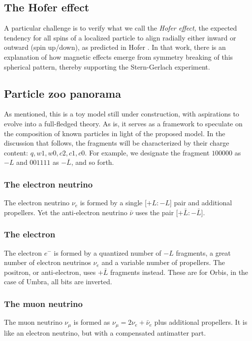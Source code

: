 \documentclass[12pt,english]{article}
\begin{document}
\subsection{The Hofer effect}

A particular challenge is to verify what we call the \emph{Hofer effect,} the expected tendency for all spins of a localized particle to align radially either inward or outward (spin up/down), as predicted in Hofer \cite{hofer}. In that work, there is an explanation of how magnetic effects emerge from symmetry breaking of this spherical pattern, thereby supporting the Stern-Gerlach experiment.

\subsection{Particle zoo panorama}
As mentioned, this is a toy model still under construction, with aspirations to evolve into a full-fledged theory. As is, it serves as a framework to speculate on the composition of known particles in light of the proposed model. In the discussion that follows, the fragments will be characterized by their charge content: \(q, w1, w0, c2, c1, c0\). For example, we designate the fragment \(100000\) as \(-L\) and \(001111\) as \(-\bar{L}\), and so forth.  

\subsubsection{The electron neutrino}
The electron neutrino $\nu_e$ is formed by a single [$+L:-L$] pair and additional propellers. Yet the anti-electron neutrino $\bar{\nu}$ uses the pair [$+\bar{L}:-\bar{L}$].

\subsubsection{The electron}
The electron $e^-$ is formed by a quantized number of $-L$ fragments, a great number of electron neutrinos $\nu_e$ and a variable number of propellers. The positron, or anti-electron, uses $+\bar{L}$ fragments instead. These are for Orbis, in the case of Umbra, all bits are inverted.

\subsubsection{The muon neutrino}
The muon neutrino $\nu_{\mu}$ is formed as $\nu_{\mu}=2\nu_e+\bar{\nu}_e$ plus additional propellers. It is like an electron neutrino, but with a compensated antimatter part.
\end{document}
